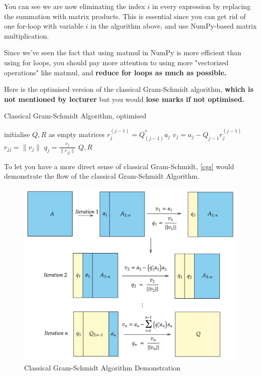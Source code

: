 \noindent 
You can see we are now eliminating the index \(i\) in every expression by replacing the summation with matrix products. This is essential since you can get rid of one for-loop with variable \(i\)  in the algorithm above, and use NumPy-based matrix multiplication. \smallskip

\noindent Since we've seen the fact that using matmul in NumPy is more efficient than using for loops, you should pay more attention to using more "vectorized operations" like matmul, and \textbf{reduce for loops as much as possible. }

\noindent Here is the optimised version of the classical Gram-Schmidt algorithm, \textbf{which is not mentioned by lecturer} but you would \textbf{lose marks if not optimised.}
\begin{algorithm}
  \caption{Classical Gram-Schmidt Algorithm, optimised}
  \begin{algorithmic}[1]
    \State initialise \(Q, R\)  as empty matrices
      \State \(r_j^{(j - 1)} = Q_{(j - 1)}^{*}a_j\)
      \State \(v_j = a_j - Q_{j - 1}r_j^{(j - 1)}\)
      \State \(r_{jj} = \|v_j\|\)
      \State \(q_j = \frac{v_j}{\|r_{jj}\|}\)    
    \EndFor
    \State \Return \(Q, R\) 
  \EndProcedure
  \end{algorithmic}
\end{algorithm}

\newpage
\noindent To let you have a more direct sense of classical Gram-Schmidt, \autoref{cgs} would demonstrate the flow of the classical Gram-Schmidt Algorithm. 
\begin{figure}[htp]
  \centering
  \includegraphics[width=\textwidth]{imgs/cgs.png}
  \caption{Classical Gram-Schmidt Algorithm Demonstration}
  \label{cgs}
\end{figure}

